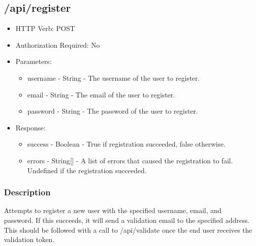 \documentclass[12pt]{article}
\begin{document}
        \subsection{/api/register}
            \begin{itemize}
                \item HTTP Verb: POST
                \item Authorization Required: No
                \item Parameters:
                \begin{itemize}
                    \item username - String - The username of the user to register.
                    \item email - String - The email of the user to register.
                    \item password - String - The password of the user to register.
                \end{itemize}
                \item Response:
                \begin{itemize}
                    \item success - Boolean - True if registration succeeded, false otherwise.
                    \item errors - String[] - A list of errors that caused the registration to fail. Undefined if the registration succeeded.
                \end{itemize}
            \end{itemize}
            \subsubsection{Description}
                Attempts to register a new user with the specified username, email, and password. If this succeeds, it will send a validation email to the specified address.
                This should be followed with a call to /api/validate once the end user receives the validation token.
            
\end{document}
